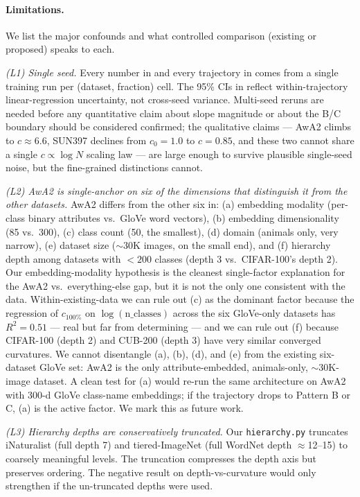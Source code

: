 \documentclass{article}
\begin{document}
\paragraph{Limitations.}
We list the major confounds and what controlled comparison (existing or proposed) speaks to each.

\textit{(L1) Single seed.}
Every number in  and every trajectory in  comes from a single training run per (dataset, fraction) cell.
The 95\% CIs in  reflect within-trajectory linear-regression uncertainty, not cross-seed variance.
Multi-seed reruns are needed before any quantitative claim about slope magnitude or about the B/C boundary should be considered confirmed; the qualitative claims --- AwA2 climbs to $c \approx 6.6$, SUN397 declines from $c_0 = 1.0$ to $c = 0.85$, and these two cannot share a single $c \propto \log N$ scaling law --- are large enough to survive plausible single-seed noise, but the fine-grained distinctions cannot.

\textit{(L2) AwA2 is single-anchor on six of the dimensions that distinguish it from the other datasets.}
AwA2 differs from the other six in: (a) embedding modality (per-class binary attributes vs.\ GloVe word vectors), (b) embedding dimensionality (85 vs.\ 300), (c) class count (50, the smallest), (d) domain (animals only, very narrow), (e) dataset size ($\sim$30K images, on the small end), and (f) hierarchy depth among datasets with $<200$ classes (depth 3 vs.\ CIFAR-100's depth 2).
Our embedding-modality hypothesis is the cleanest single-factor explanation for the AwA2 vs.\ everything-else gap, but it is not the only one consistent with the data.
Within-existing-data we can rule out (c) as the dominant factor because the regression of $c_{100\%}$ on $\log(\text{n\_classes})$ across the six GloVe-only datasets has $R^2 = 0.51$ --- real but far from determining --- and we can rule out (f) because CIFAR-100 (depth 2) and CUB-200 (depth 3) have very similar converged curvatures.
We cannot disentangle (a), (b), (d), and (e) from the existing six-dataset GloVe set: AwA2 is the only attribute-embedded, animals-only, $\sim$30K-image dataset.
A clean test for (a) would re-run the same architecture on AwA2 with 300-d GloVe class-name embeddings; if the trajectory drops to Pattern B or C, (a) is the active factor. We mark this as future work.

\textit{(L3) Hierarchy depths are conservatively truncated.}
Our \texttt{hierarchy.py} truncates iNaturalist (full depth 7) and tiered-ImageNet (full WordNet depth $\approx$12--15) to coarsely meaningful levels. The truncation compresses the depth axis but preserves ordering. The negative result on depth-vs-curvature would only strengthen if the un-truncated depths were used.
\end{document}
